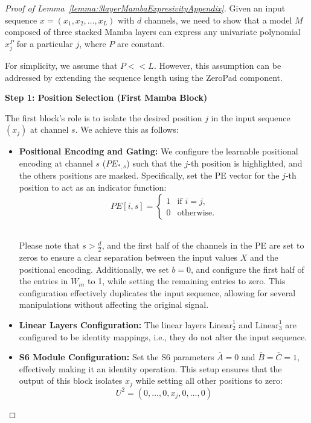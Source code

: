 \begin{proof}[Proof of Lemma~\ref{lemma:3layerMambaExpresivityAppendix}]\quad
\smallskip
Given an input sequence \( x = (x_1, x_2, \dots, x_L) \) with \( d \) channels, we need to show that a model \( M \) composed of three stacked Mamba layers can express any univariate polynomial \( x_j^P \) for a particular \( j \), where \( P \) are constant.

For simplicity, we assume that $P <<L$. However, this assumption can be addressed by extending the sequence length using the ZeroPad component.

\noindent \textbf{Step 1: Position Selection (First Mamba Block)} 

The first block's role is to isolate the desired position \( j \) in the input sequence $(x_j)$ at channel $s$. We achieve this as follows:

\begin{itemize}
    \item \textbf{Positional Encoding and Gating:} We configure the learnable positional encoding at channel $s$ (\( PE_{*,s} \)) such that the \( j \)-th position is highlighted, and the others positions are masked. Specifically, set the PE vector for the \( j \)-th position to act as an indicator function:
    \[
    PE[i,s] = \begin{cases} 
       1 & \text{if } i = j, \\
       0 & \text{otherwise}.
    \end{cases}
    \]\

    Please note that $s> \frac{d}{2}$, and the first half of the channels in the PE are set to zeros to ensure a clear separation between the input values $X$ and the positional encoding. Additionally, we set $b=0$, and configure the first half of the entries in $W_{in}$ to 1, while setting the remaining entries to zero. This configuration effectively duplicates the input sequence, allowing for several manipulations without affecting the original signal.
    
    \item \textbf{Linear Layers Configuration:} The linear layers \( \text{Linear}_2^1 \) and \( \text{Linear}_3^1 \) are configured to be identity mappings, i.e., they do not alter the input sequence.
    
    \item \textbf{S6 Module Configuration:} Set the S6 parameters \( \bar{A} = 0 \) and \( \bar{B} = \bar{C} = 1 \), effectively making it an identity operation. This setup ensures that the output of this block isolates \( x_j \) while setting all other positions to zero:
    \[
    U^2 = (0, \dots, 0, x_j, 0, \dots, 0)
    \]
\end{itemize}


\end{proof}
